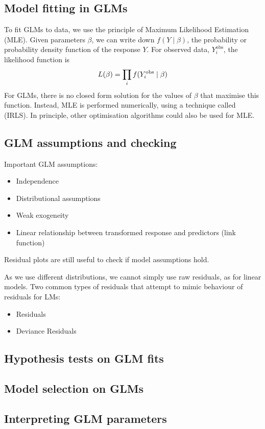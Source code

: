 \subsection{Model fitting in GLMs}

To fit GLMs to data, we use the principle of Maximum Likelihood Estimation (MLE). Given parameters $\beta$, we can write down $f(Y\mid \beta)$, the probability or probability density function of the response $Y$. For observed data, $Y_i^{\text{obs}}$, the likelihood function is
\begin{align}
	L(\beta) = \prod_i f(Y_i^{\text{obs}}\mid \beta)\notag
\end{align}
For GLMs, there is no closed form solution for the values of $\beta$ that maximise this function. Instead, MLE is performed numerically, using a technique called  (IRLS). In principle, other optimisation algorithms could also be used for MLE.

\subsection{GLM assumptions and checking}

Important GLM assumptions:
\begin{itemize}
	\item Independence
	\item Distributional assumptions
	\item Weak exogeneity
	\item Linear relationship between transformed response and predictors (link function)
\end{itemize}
Residual plots are still useful to check if model assumptions hold.

As we use different distributions, we cannot simply use raw residuals, as for linear models. Two common types of residuals that attempt to mimic behaviour of residuals for LMs:
\begin{itemize}
	\item {} Residuals
	\item Deviance Residuals
\end{itemize}

\subsection{Hypothesis tests on GLM fits}

\subsection{Model selection on GLMs}

\subsection{Interpreting GLM parameters}